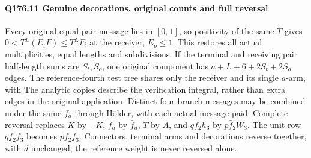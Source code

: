 \paragraph{Q176.11 Genuine decorations, original counts and full reversal}\label{part:Q176.11}
Every original equal-pair message lies in $[0,\allowbreak 1]$, so positivity of the
same $T$ gives $0<\allowbreak T^L(E_tF)\le\allowbreak  T^LF$; at the receiver, $E_o\le\allowbreak 1$.
This restores all actual multiplicities, equal lengths and subdivisions.
If the terminal and receiving pair half-length sums are $S_t,\allowbreak S_o$,
one original component has $a+L+6+2S_t+2S_o$ edges.
The reference-fourth test tree shares only the receiver and its single
$a$-arm, with
The analytic copies describe the verification integral, rather than extra
edges in the original application. Distinct four-branch messages may be
combined under the same $f_a$ through H\"older, with each actual message paid.
Complete reversal replaces $K$ by $-K$, $f_a$ by $\bar f_a$,
$T$ by $A$, and $qf_2h_3$ by $p\bar f_2W_3$.
The unit row $qf_2\bar f_3$ becomes $p\bar f_2f_3$.
Connectors, terminal arms and decorations reverse together, with $d$
unchanged; the reference weight is never reversed alone.
